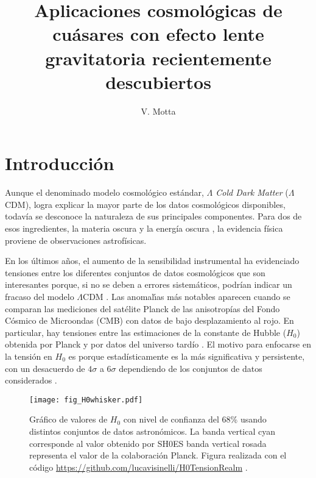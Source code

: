 \documentclass[baaa]{baaa}
\title{Aplicaciones cosmológicas de cuásares con efecto lente gravitatoria recientemente descubiertos}
\author{
V. Motta\inst{1}
}
\institute{
Instituto de F\'{\i}sica y Astronom\'{\i}a, Facultad de Ciencias, Universidad de Valpara\'{\i}so, Chile 
}
\begin{document}
\maketitle
\section{Introducci\'on}

Aunque el denominado modelo cosmológico estándar, {\em $\Lambda$ Cold Dark Matter} ($\Lambda$CDM), logra explicar la mayor parte de los datos cosmológicos disponibles, todavía se desconoce la naturaleza de sus principales componentes. 
Para dos de esos ingredientes, la materia oscura  \citep[DM,][]{rubin1970,trimble1987} y la energía oscura  \citep[DE,][]{riess1998,perlmutter1999}, la evidencia física proviene de observaciones astrofísicas. 

En los \'ultimos a\~nos, el aumento de la sensibilidad instrumental ha evidenciado  tensiones entre los diferentes conjuntos de datos cosmológicos que son interesantes porque, si no se deben a errores sistemáticos, podrían indicar un fracaso del modelo $\Lambda$CDM  \citep{efstathiou2021}. Las anomal\'{\i}as m\'as notables aparecen cuando se comparan las mediciones del sat\'elite Planck \citep{planck2020} de las anisotropías del Fondo Cósmico de Microondas (CMB) con datos de bajo desplazamiento al rojo. En particular, hay tensiones entre las estimaciones de la constante de Hubble ($H_0$) obtenida por Planck y por datos del universo tardío \citep[e.g.][]{riess2021}. El motivo para enfocarse en  la tensión en $H_0$ es porque estadísticamente es la más significativa y  persistente, con un desacuerdo de $4\sigma$ a $6\sigma$ dependiendo de los conjuntos de datos considerados \citep[ver Fig \ref{fig0},][]{divalentino2021}.  

\begin{figure}[!t]
	\centering
	\texttt{[image: fig\_H0whisker.pdf]}
	\caption{Gr\'afico de valores de $H_0$ con nivel de confianza del 68\% usando distintos conjuntos de datos astron\'omicos. La banda vertical cyan corresponde al valor obtenido por SH0ES banda vertical rosada representa el valor de la colaboraci\'on Planck.  Figura realizada con el c\'odigo \url{https://github.com/lucavisinelli/H0TensionRealm} \citep{divalentino2021}.  
	}
	\label{fig0}
\end{figure}
\end{document}

